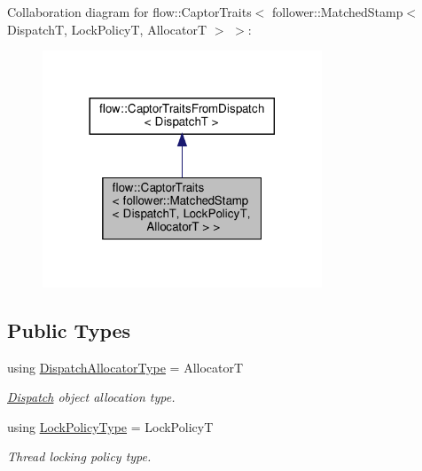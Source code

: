 Collaboration diagram for flow\+:\+:Captor\+Traits$<$ follower\+:\+:Matched\+Stamp$<$ DispatchT, Lock\+PolicyT, AllocatorT $>$ $>$\+:\nopagebreak
\begin{figure}[H]
\begin{center}
\leavevmode
\includegraphics[width=236pt]{structflow_1_1_captor_traits_3_01follower_1_1_matched_stamp_3_01_dispatch_t_00_01_lock_policy_t_a3a59b63c038e0a179927a24797b25e0}
\end{center}
\end{figure}
\subsection*{Public Types}
\begin{DoxyCompactItemize}
\item 
\mbox{\label{structflow_1_1_captor_traits_3_01follower_1_1_matched_stamp_3_01_dispatch_t_00_01_lock_policy_t_00_01_allocator_t_01_4_01_4_a7f34a8d39dbad99c08467159eb5d3c48}} 
using \hyperlink{structflow_1_1_captor_traits_3_01follower_1_1_matched_stamp_3_01_dispatch_t_00_01_lock_policy_t_00_01_allocator_t_01_4_01_4_a7f34a8d39dbad99c08467159eb5d3c48}{Dispatch\+Allocator\+Type} = AllocatorT
\begin{DoxyCompactList}\small\item\em \hyperlink{classflow_1_1_dispatch}{Dispatch} object allocation type. \end{DoxyCompactList}\item 
\mbox{\label{structflow_1_1_captor_traits_3_01follower_1_1_matched_stamp_3_01_dispatch_t_00_01_lock_policy_t_00_01_allocator_t_01_4_01_4_a073508e6620aad4f92f0cf3ab9c6f4f2}} 
using \hyperlink{structflow_1_1_captor_traits_3_01follower_1_1_matched_stamp_3_01_dispatch_t_00_01_lock_policy_t_00_01_allocator_t_01_4_01_4_a073508e6620aad4f92f0cf3ab9c6f4f2}{Lock\+Policy\+Type} = Lock\+PolicyT
\begin{DoxyCompactList}\small\item\em Thread locking policy type. \end{DoxyCompactList}\end{DoxyCompactItemize}


